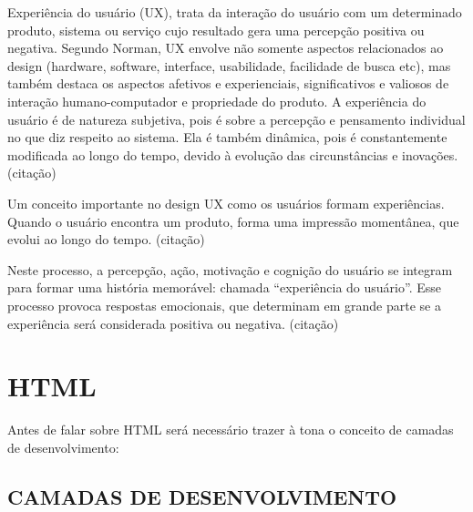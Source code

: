 Experiência do usuário (UX), trata da interação do usuário com um
determinado produto, sistema ou serviço cujo resultado gera uma
percepção positiva ou negativa. Segundo Norman, UX envolve não somente
aspectos relacionados ao design (hardware, software, interface,
usabilidade, facilidade de busca etc), mas também destaca os aspectos
afetivos e experienciais, significativos e valiosos de interação
humano-computador e propriedade do produto. A experiência do usuário é
de natureza subjetiva, pois é sobre a percepção e pensamento individual
no que diz respeito ao sistema. Ela é também dinâmica, pois é
constantemente modificada ao longo do tempo, devido à evolução das
circunstâncias e inovações. (citação)

Um conceito importante no design UX como os usuários formam
experiências. Quando o usuário encontra um produto, forma uma impressão
momentânea, que evolui ao longo do tempo. (citação)

Neste processo, a percepção, ação, motivação e cognição do usuário se
integram para formar uma história memorável: chamada “experiência do
usuário”. Esse processo provoca respostas emocionais, que determinam em
grande parte se a experiência será considerada positiva ou negativa.
(citação) 

\section{HTML}
\label{sec:HTML}
	Antes de falar sobre HTML será necessário trazer à tona o conceito de camadas de desenvolvimento:
	\subsection{CAMADAS DE DESENVOLVIMENTO}
	\label{sec:CAMADASDEDESENVOLVIMENTO}
	
